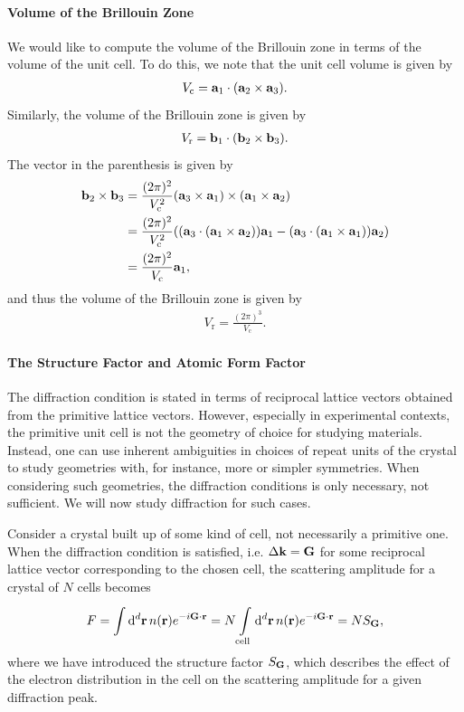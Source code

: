 \paragraph{Volume of the Brillouin Zone}
We would like to compute the volume of the Brillouin zone in terms of the volume of the unit cell. To do this, we note that the unit cell volume is given by
\begin{align*}
	V_{\text{c}} = \vb{a}_{1}\cdot(\vb{a}_{2}\times\vb{a}_{3}).
\end{align*}
Similarly, the volume of the Brillouin zone is given by
\begin{align*}
	V_{\text{r}} = \vb{b}_{1}\cdot(\vb{b}_{2}\times\vb{b}_{3}).
\end{align*}
The vector in the parenthesis is given by
\begin{align*}
	\vb{b}_{2}\times\vb{b}_{3} &= \frac{(2\pi)^{2}}{V_{\text{c}}^{2}}(\vb{a}_{3}\times\vb{a}_{1})\times (\vb{a}_{1}\times\vb{a}_{2}) \\
	                           &= \frac{(2\pi)^{2}}{V_{\text{c}}^{2}}((\vb{a}_{3}\cdot(\vb{a}_{1}\times\vb{a}_{2}))\vb{a}_{1} - (\vb{a}_{3}\cdot(\vb{a}_{1}\times\vb{a}_{1}))\vb{a}_{2}) \\
	                           &= \frac{(2\pi)^{2}}{V_{\text{c}}}\vb{a}_{1},
\end{align*}
and thus the volume of the Brillouin zone is given by
\begin{align*}
	V_{\text{r}} = \frac{(2\pi)^{3}}{V_{\text{c}}}.
\end{align*}

\paragraph{The Structure Factor and Atomic Form Factor}
The diffraction condition is stated in terms of reciprocal lattice vectors obtained from the primitive lattice vectors. However, especially in experimental contexts, the primitive unit cell is not the geometry of choice for studying materials. Instead, one can use inherent ambiguities in choices of repeat units of the crystal to study geometries with, for instance, more or simpler symmetries. When considering such geometries, the diffraction conditions is only necessary, not sufficient. We will now study diffraction for such cases.

Consider a crystal built up of some kind of cell, not necessarily a primitive one. When the diffraction condition is satisfied, i.e. $\Delta\vb{k} = \vb{G}$ for some reciprocal lattice vector corresponding to the chosen cell, the scattering amplitude for a crystal of $N$ cells becomes
\begin{align*}
	F = \integ[d]{}{}{\vb{r}}{n(\vb{r})e^{-i\vb{G}\cdot\vb{r}}} = N\integ[d]{\text{cell}}{}{\vb{r}}{n(\vb{r})e^{-i\vb{G}\cdot\vb{r}}} = NS_{\vb{G}},
\end{align*}
where we have introduced the structure factor $S_{\vb{G}}$, which describes the effect of the electron distribution in the cell on the scattering amplitude for a given diffraction peak.


